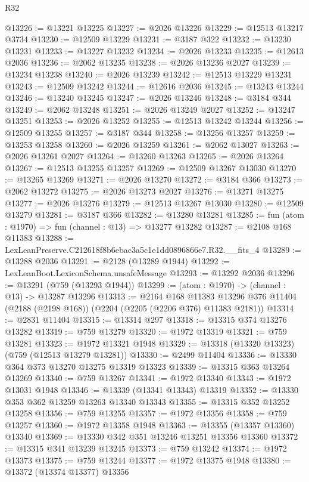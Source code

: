 \begin{lexlean}{R32}
\begin{coremodule}
@13226 := @13221 @13225
@13227 := @2026 @13226
@13229 := @12513 @13217 @3734
@13230 := @12509 @13229
@13231 := @3187 @322
@13232 := @13230 @13231
@13233 := @13227 @13232
@13234 := @2026 @13233
@13235 := @12613 @2036
@13236 := @2062 @13235
@13238 := @2026 @13236 @2027
@13239 := @13234 @13238
@13240 := @2026 @13239
@13242 := @12513 @13229 @13231
@13243 := @12509 @13242
@13244 := @12616 @2036
@13245 := @13243 @13244
@13246 := @13240 @13245
@13247 := @2026 @13246
@13248 := @3184 @344
@13249 := @2062 @13248
@13251 := @2026 @13249 @2027
@13252 := @13247 @13251
@13253 := @2026 @13252
@13255 := @12513 @13242 @13244
@13256 := @12509 @13255
@13257 := @3187 @344
@13258 := @13256 @13257
@13259 := @13253 @13258
@13260 := @2026 @13259
@13261 := @2062 @13027
@13263 := @2026 @13261 @2027
@13264 := @13260 @13263
@13265 := @2026 @13264
@13267 := @12513 @13255 @13257
@13269 := @12509 @13267 @13030
@13270 := @13265 @13269
@13271 := @2026 @13270
@13272 := @3184 @366
@13273 := @2062 @13272
@13275 := @2026 @13273 @2027
@13276 := @13271 @13275
@13277 := @2026 @13276
@13279 := @12513 @13267 @13030
@13280 := @12509 @13279
@13281 := @3187 @366
@13282 := @13280 @13281
@13285 := fun (atom : @1970) => fun (channel : @13) => @13277 @13282
@13287 := @2108 @168 @11383
@13288 := LexLeanPreserve.C212618f8b6ebac3a5c1e1dd0896866e7.R32.__fits_4
@13289 := @13288 @2036
@13291 := @2128 (@13289 @1944)
@13292 := LexLeanBoot.LexiconSchema.unsafeMessage
@13293 := @13292 @2036
@13296 := @13291 (@759 (@13293 @1944))
@13299 := (atom : @1970) -> (channel : @13) -> @13287 @13296
@13313 := @2164
    @168
    @11383
    @13296
    @376
    @11404
    (@2188 (@2198 @168))
    (@2204 (@2205 (@2206 @376) @11383 @2181))
@13314 := @2831 @11404
@13315 := @13314 @297
@13318 := @13315 @374 @13276 @13282
@13319 := @759 @13279
@13320 := @1972 @13319
@13321 := @759 @13281
@13323 := @1972 @13321 @1948
@13329 := @13318 (@13320 @13323) (@759 (@12513 @13279 @13281))
@13330 := @2499 @11404
@13336 := @13330 @364 @373 @13270 @13275 @13319 @13323
@13339 := @13315 @363 @13264 @13269
@13340 := @759 @13267
@13341 := @1972 @13340
@13343 := @1972 @13031 @1948
@13346 := @13339 (@13341 @13343) @13319
@13352 := @13330 @353 @362 @13259 @13263 @13340 @13343
@13355 := @13315 @352 @13252 @13258
@13356 := @759 @13255
@13357 := @1972 @13356
@13358 := @759 @13257
@13360 := @1972 @13358 @1948
@13363 := @13355 (@13357 @13360) @13340
@13369 := @13330 @342 @351 @13246 @13251 @13356 @13360
@13372 := @13315 @341 @13239 @13245
@13373 := @759 @13242
@13374 := @1972 @13373
@13375 := @759 @13244
@13377 := @1972 @13375 @1948
@13380 := @13372 (@13374 @13377) @13356

\end{coremodule}
\end{lexlean}
